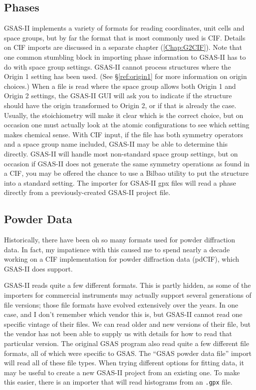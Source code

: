 \subsection{Phases}\label{ref:PhaseImporter}
GSAS-II implements a variety of formats for reading coordinates, unit cells and space groups, but by far the format that is most commonly used is CIF. Details on CIF imports are discussed in a separate chapter (\ref{Chap:G2CIF}). Note that one common stumbling block in importing phase information to GSAS-II has to do with space group settings. GSAS-II cannot process structures where the Origin 1 setting has been used. (See \S\ref{ref:origin1} for more information on origin choices.) When a file is read where the space group allows both Origin 1 and Origin 2 settings, the GSAS-II GUI will ask you to indicate if the structure should have the origin transformed to Origin 2, or if that is already the case. Usually, the stoichiometry will make it clear which is the correct choice, but on occasion one must actually look at the atomic configurations to see which setting makes chemical sense.  With CIF input, if the file has both symmetry operators and a space group name included, GSAS-II may be able to determine this directly. GSAS-II will handle most non-standard space group settings, but on occasion if GSAS-II does not generate the same symmetry operations as found in a CIF, you may be offered the chance to use a Bilbao utility to put the structure into a standard setting.  The importer for GSAS-II gpx files will read a phase directly from a previously-created GSAS-II project file. 
\subsection{Powder Data}
Historically, there have been oh so many formats used for powder diffraction data. In fact, my impatience with this caused me to spend nearly a decade working on a CIF implementation for powder diffraction data (pdCIF), which GSAS-II does support. 

GSAS-II reads quite a few different formats. This is partly hidden, as some of the importers for commercial instruments may actually support several generations of file versions; those file formats have evolved extensively over the years. In one case, and I don't remember which vendor this is, but GSAS-II cannot read one specific vintage of their files. We can read older and new versions of their file, but the vendor has not been able to supply us with details for how to read that particular version. The original GSAS program also read quite a few different file formats, all of which were specific to GSAS. The ``GSAS powder data file'' import will read all of these file types. When trying different options for fitting data, it may be useful to create a new GSAS-II project from an existing one. To make this easier, there is an importer that will read histograms from an \texttt{.gpx} file. 


